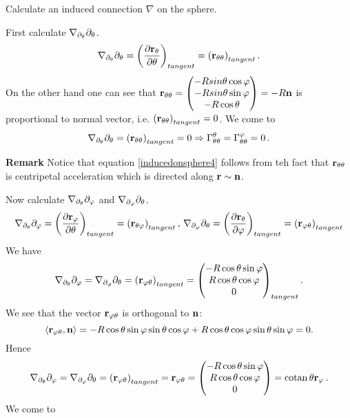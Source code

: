 \documentclass[12pt]{article}
\theoremstyle{theorem}
\numberwithin{equation}{section}
\begin{document}
Calculate an induced connection  $\nabla$ on the sphere.

First calculate $\nabla_{\partial_\theta}\partial_\theta$.
\begin{equation*}
    \nabla_{\partial_\theta}\partial_\theta=\left({\partial {\bf r}_\theta\over \partial\theta}\right)_{tangent}=
    \left({\bf r}_{\theta\theta}\right)_{tangent}.
\end{equation*}
On the other hand one can see that ${\bf r}_{\theta\theta}=\begin{pmatrix}
            -Rsin\theta\cos\varphi\cr
            -Rsin\theta\sin\varphi\cr
            -R\cos\theta\cr
                  \end{pmatrix}=-R{\bf n}$ is proportional to normal vector, i.e. $\left({\bf r}_{\theta\theta}\right)_{tangent}=0$.
                  We come to
\begin{equation}\label{inducedonsphere4}
    \nabla_{\partial_\theta}\partial_\theta=\left({\bf r}_{\theta\theta}\right)_{tangent}=0 \Rightarrow
    \Gamma^\theta_{\theta\theta}=\Gamma^\varphi_{\theta\theta}=0\,.
\end{equation}

{\bf Remark}  Notice that equation \eqref{inducedonsphere4}
follows from teh fact that ${\bf r}_{\theta\theta}$
is centripetal acceleration which is directed along 
${\bf r}\sim {\bf n}$.

\smallskip 



Now calculate $\nabla_{\partial_\theta}\partial_\varphi$ and $\nabla_{\partial_\varphi}\partial_\theta$.
\begin{equation*}
    \nabla_{\partial_\theta}\partial_\varphi=\left({\partial {\bf r}_\varphi\over \partial\theta}\right)_{tangent}=
    \left({\bf r}_{\theta\varphi}\right)_{tangent},\,
    \nabla_{\partial_\varphi}\partial_\theta=\left({\partial {\bf r}_\theta\over \partial\varphi}\right)_{tangent}=
    \left({\bf r}_{\varphi\theta}\right)_{tangent}
\end{equation*}
 We have
           $$
           \nabla_{\partial_\theta}\partial_\varphi=\nabla_{\partial_\varphi}\partial_\theta=\left({\bf r}_{\varphi\theta}\right)_{tangent}=
           \begin{pmatrix}
            -R\cos\theta\sin\varphi\cr
            R\cos\theta\cos\varphi\cr
            0\cr
                  \end{pmatrix}_{tangent}.
           $$
We see that the vector ${\bf r}_{\varphi\theta}$ is orthogonal to ${\bf n}$:
\begin{equation*}
     \langle{\bf r}_{\varphi\theta},{\bf n}\rangle=-R\cos\theta\sin\varphi \sin\theta\cos\varphi+
     R\cos\theta\cos\varphi\sin\theta\sin\varphi=0.
\end{equation*}
Hence
\begin{equation*}
 \nabla_{\partial_\theta}\partial_\varphi=\nabla_{\partial_\varphi}\partial_\theta=
 \left({\bf r}_{\varphi\theta}\right)_{tangent}={\bf r}_{\varphi\theta}=
 \begin{pmatrix}
            -R\cos\theta\sin\varphi\cr
            R\cos\theta\cos\varphi\cr
            0\cr
                  \end{pmatrix}=
                  {\rm cotan\,}\theta  {\bf r}_\varphi\,.
\end{equation*}
We come to
\end{document}
